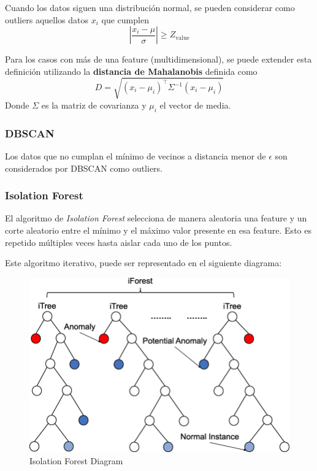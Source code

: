 Cuando los datos siguen una distribución normal, se pueden considerar como outliers aquellos datos $x_i$ que cumplen 
$$\left | \frac{x_i - \mu}{\sigma}\right | \geq Z_{\text{value}}$$

Para los casos con más de una feature (multidimensional), se puede extender esta definición utilizando la \textbf{distancia de Mahalanobis} definida como 
$$
D = \sqrt{(x_i - \mu_i)^{\top}\Sigma^{-1}(x_i - \mu_i)}
$$
Donde $\Sigma$ es la matriz de covarianza y $\mu_i$ el vector de media. 

\subsubsection{DBSCAN}

Los datos que no cumplan el mínimo de vecinos a distancia menor de $\epsilon$ son considerados por DBSCAN como outliers.

\subsubsection{Isolation Forest}

El algoritmo de \textit{Isolation Forest} selecciona de manera aleatoria una feature y un corte aleatorio entre el mínimo y el máximo valor presente en esa feature. Esto es repetido múltiples veces hasta aislar cada uno de los puntos.

Este algoritmo iterativo, puede ser representado en el siguiente diagrama:

\begin{figure}[H]
    \center
    \includegraphics[scale=0.3]{notebooks/Others/img/isolation_forest_diagram.png}
    \caption{Isolation Forest Diagram}
\end{figure}

